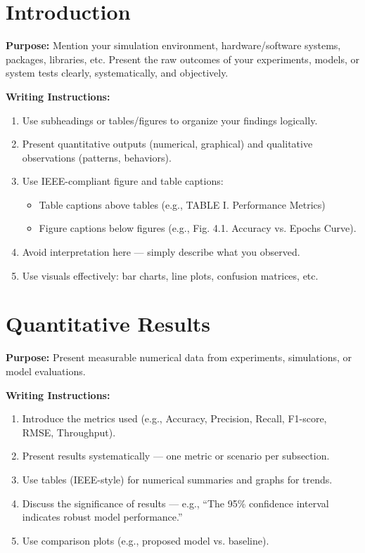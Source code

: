 \section{Introduction}

{\color{blue}\textbf{Purpose:}
Mention your simulation environment, hardware/software systems, packages, libraries, etc. Present the raw outcomes of your experiments, models, or system tests clearly, systematically, and objectively.} \\

{\color{red}\textbf{Writing Instructions:}
\begin{enumerate}
    \item Use subheadings or tables/figures to organize your findings logically.
    
    \item Present quantitative outputs (numerical, graphical) and qualitative observations (patterns, behaviors).
    
    \item Use IEEE-compliant figure and table captions:
    \begin{itemize}
        \item Table captions above tables (e.g., TABLE I. Performance Metrics)
        \item Figure captions below figures (e.g., Fig. 4.1. Accuracy vs. Epochs Curve).
    \end{itemize}
    
    \item Avoid interpretation here — simply describe what you observed.
    
    \item Use visuals effectively: bar charts, line plots, confusion matrices, etc.
\end{enumerate}}


\section{Quantitative Results}

{\color{blue}\textbf{Purpose:}
Present measurable numerical data from experiments, simulations, or model evaluations.} \\

{\color{red}\textbf{Writing Instructions:}
\begin{enumerate}
    \item Introduce the metrics used (e.g., Accuracy, Precision, Recall, F1-score, RMSE, Throughput).
    
    \item Present results systematically — one metric or scenario per subsection.
    
    \item Use tables (IEEE-style) for numerical summaries and graphs for trends.
    
    \item Discuss the significance of results — e.g., ``The 95\% confidence interval indicates robust model performance.''
    
    \item Use comparison plots (e.g., proposed model vs. baseline).
\end{enumerate}}

